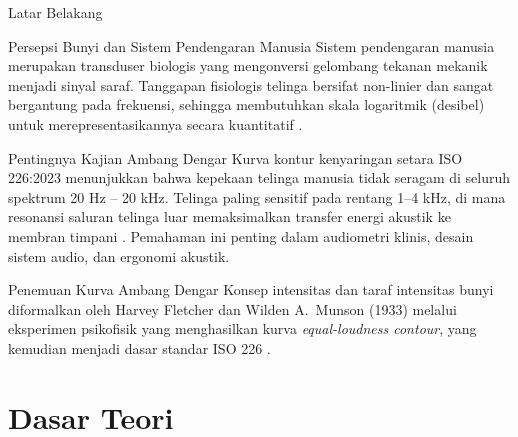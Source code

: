 \documentclass[aspectratio=169, 10pt]{beamer}
\begin{document}
	\begin{frame}{Latar Belakang}
		\begin{block}{Persepsi Bunyi dan Sistem Pendengaran Manusia}
			\footnotesize
			Sistem pendengaran manusia merupakan transduser biologis yang mengonversi gelombang tekanan mekanik menjadi sinyal saraf. Tanggapan fisiologis telinga bersifat non-linier dan sangat bergantung pada frekuensi, sehingga membutuhkan skala logaritmik (desibel) untuk merepresentasikannya secara kuantitatif \parencite{halliday2021}.
		\end{block}

		\begin{block}{Pentingnya Kajian Ambang Dengar}
			\footnotesize
			Kurva kontur kenyaringan setara ISO 226:2023 menunjukkan bahwa kepekaan telinga manusia tidak seragam di seluruh spektrum 20 Hz -- 20 kHz. Telinga paling sensitif pada rentang 1--4 kHz, di mana resonansi saluran telinga luar memaksimalkan transfer energi akustik ke membran timpani \parencite{moller2024}. Pemahaman ini penting dalam audiometri klinis, desain sistem audio, dan ergonomi akustik.
		\end{block}

		\begin{block}{Penemuan Kurva Ambang Dengar}
			\footnotesize
			Konsep intensitas dan taraf intensitas bunyi diformalkan oleh Harvey Fletcher dan Wilden A.\ Munson (1933) melalui eksperimen psikofisik yang menghasilkan kurva \textit{equal-loudness contour}, yang kemudian menjadi dasar standar ISO 226 \parencite{iso2023}.
		\end{block}
	\end{frame}

	\section{Dasar Teori}
\end{document}
